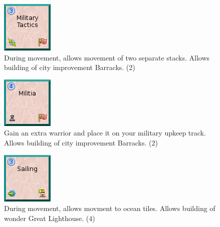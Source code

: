 \documentclass[11pt,a4paper,titlepage]{article}
\begin{document}
{{  \begin{figure}[!htb]
    \begin{minipage}[c]{0.1\textwidth}
      \includegraphics[scale=.7]{doe_tech_military_tactics.png}
    \end{minipage}\hfill
    \begin{minipage}[c]{0.6\textwidth}
      \captionsetup{labelformat=empty, justification=justified, singlelinecheck=false}
      \caption{During movement, allows movement of two separate stacks. Allows building of city improvement Barracks. (2)}
    \end{minipage}\hfill
    \label{fig:tech_military_tactics}
  \end{figure}

  \begin{figure}[!htb]
    \begin{minipage}[c]{0.1\textwidth}
      \includegraphics[scale=.7]{doe_tech_militia.png}
    \end{minipage}\hfill
    \begin{minipage}[c]{0.6\textwidth}
      \captionsetup{labelformat=empty, justification=justified, singlelinecheck=false}
      \caption{Gain an extra warrior and place it on your military upkeep track. Allows building of city improvement Barracks. (2)}
    \end{minipage}\hfill
    \label{fig:tech_militia}
  \end{figure}

  \begin{figure}[!htb]
    \begin{minipage}[c]{0.1\textwidth}
      \includegraphics[scale=.7]{doe_tech_sailing.png}
    \end{minipage}\hfill
    \begin{minipage}[c]{0.6\textwidth}
      \captionsetup{labelformat=empty, justification=justified, singlelinecheck=false}
      \caption{During movement, allows movment to ocean tiles. Allows building of wonder Great Lighthouse. (4)}
    \end{minipage}\hfill
    \label{fig:tech_sailing}
  \end{figure}

  }\label{subsec:red_technologies}

}\label{sec:technology_tiles}
\end{document}
